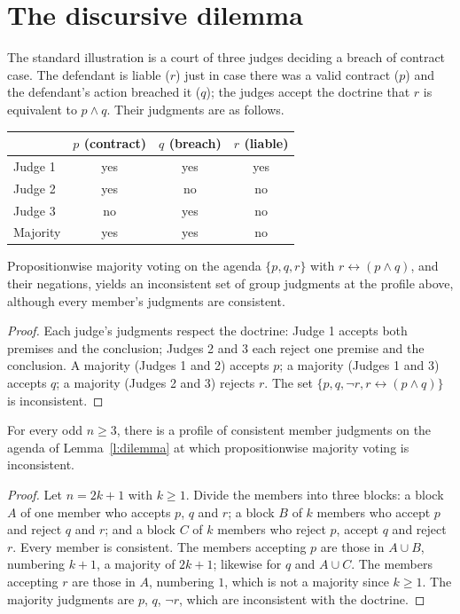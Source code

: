 \documentclass{situationist-preprint}
\begin{document}
\section{The discursive dilemma}\label{s:dilemma}

The standard illustration is a court of three judges deciding a breach of contract case. The defendant is liable ($r$) just in case there was a valid contract ($p$) and the defendant's action breached it ($q$); the judges accept the doctrine that $r$ is equivalent to $p \wedge q$. Their judgments are as follows.

\begin{center}
\begin{tabular}{lccc}
 & $p$ (contract) & $q$ (breach) & $r$ (liable) \\
\hline
Judge 1 & yes & yes & yes \\
Judge 2 & yes & no & no \\
Judge 3 & no & yes & no \\
\hline
Majority & yes & yes & no \\
\end{tabular}
\end{center}

\begin{lemma}\label{l:dilemma}
Propositionwise majority voting on the agenda $\{p, q, r\}$ with $r \leftrightarrow (p \wedge q)$, and their negations, yields an inconsistent set of group judgments at the profile above, although every member's judgments are consistent.
\end{lemma}

\begin{proof}
Each judge's judgments respect the doctrine: Judge 1 accepts both premises and the conclusion; Judges 2 and 3 each reject one premise and the conclusion. A majority (Judges 1 and 2) accepts $p$; a majority (Judges 1 and 3) accepts $q$; a majority (Judges 2 and 3) rejects $r$. The set $\{p, q, \neg r, r \leftrightarrow (p \wedge q)\}$ is inconsistent.
\end{proof}

\begin{proposition}\label{p:anyn}
For every odd $n \geq 3$, there is a profile of consistent member judgments on the agenda of Lemma~\ref{l:dilemma} at which propositionwise majority voting is inconsistent.
\end{proposition}

\begin{proof}
Let $n = 2k+1$ with $k \geq 1$. Divide the members into three blocks: a block $A$ of one member who accepts $p$, $q$ and $r$; a block $B$ of $k$ members who accept $p$ and reject $q$ and $r$; and a block $C$ of $k$ members who reject $p$, accept $q$ and reject $r$. Every member is consistent. The members accepting $p$ are those in $A \cup B$, numbering $k+1$, a majority of $2k+1$; likewise for $q$ and $A \cup C$. The members accepting $r$ are those in $A$, numbering $1$, which is not a majority since $k \geq 1$. The majority judgments are $p$, $q$, $\neg r$, which are inconsistent with the doctrine.
\end{proof}
\end{document}
